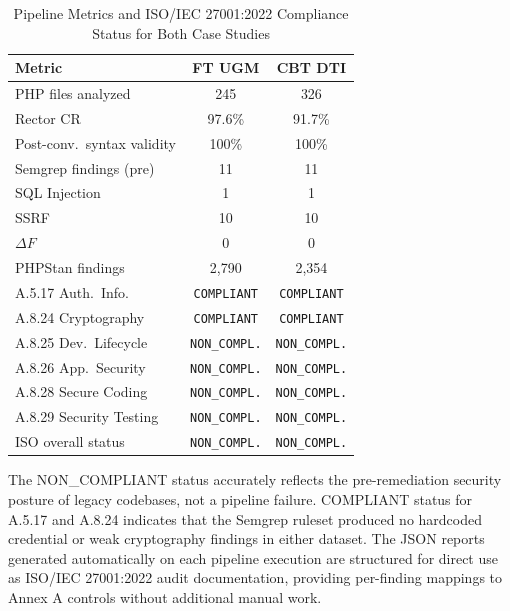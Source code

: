 \documentclass[conference]{IEEEtran}
\begin{document}
\begin{table}[htbp]
  \caption{Pipeline Metrics and ISO/IEC 27001:2022 Compliance
  Status for Both Case Studies}
  \label{tab:pipeline-metrics}
  \centering
  \renewcommand{\arraystretch}{1.2}
  \begin{tabular}{|l|c|c|}
    \hline
    \textbf{Metric} & \textbf{FT UGM} & \textbf{CBT DTI} \\
    \hline\hline
    PHP files analyzed        & 245   & 326   \\
    \hline
    Rector CR                 & 97.6\% & 91.7\% \\
    \hline
    Post-conv.\ syntax validity & 100\%  & 100\%  \\
    \hline
    Semgrep findings (pre)    & 11    & 11    \\
    \hline
    \quad SQL Injection        & 1     & 1     \\
    \hline
    \quad SSRF                 & 10    & 10    \\
    \hline
    $\Delta F$                & 0     & 0     \\
    \hline
    PHPStan findings          & 2,790 & 2,354 \\
    \hline
    A.5.17 Auth.\ Info.\      & \texttt{COMPLIANT} & \texttt{COMPLIANT} \\
    \hline
    A.8.24 Cryptography       & \texttt{COMPLIANT} & \texttt{COMPLIANT} \\
    \hline
    A.8.25 Dev.\ Lifecycle    & \texttt{NON\_COMPL.} & \texttt{NON\_COMPL.} \\
    \hline
    A.8.26 App.\ Security     & \texttt{NON\_COMPL.} & \texttt{NON\_COMPL.} \\
    \hline
    A.8.28 Secure Coding      & \texttt{NON\_COMPL.} & \texttt{NON\_COMPL.} \\
    \hline
    A.8.29 Security Testing   & \texttt{NON\_COMPL.} & \texttt{NON\_COMPL.} \\
    \hline
    ISO overall status        & \texttt{NON\_COMPL.} & \texttt{NON\_COMPL.} \\
    \hline
  \end{tabular}
\end{table}

The NON\_COMPLIANT status accurately reflects the pre-remediation
security posture of legacy codebases, not a pipeline failure.
COMPLIANT status for A.5.17 and A.8.24 indicates that the
Semgrep ruleset produced no hardcoded credential or weak
cryptography findings in either dataset. The JSON reports
generated automatically on each pipeline execution are
structured for direct use as ISO/IEC 27001:2022 audit
documentation, providing per-finding mappings to Annex A
controls without additional manual work.
\end{document}
